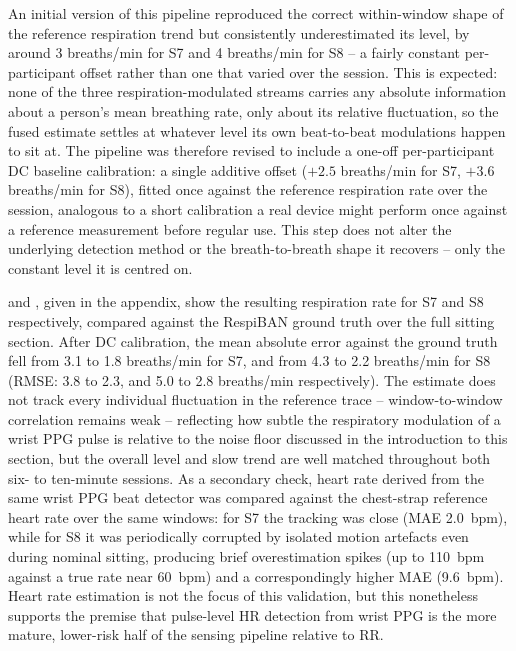 An initial version of this pipeline reproduced the correct within-window shape of the reference respiration trend but consistently underestimated its level, by around 3 breaths/min for S7 and 4 breaths/min for S8 -- a fairly constant per-participant offset rather than one that varied over the session. This is expected: none of the three respiration-modulated streams carries any absolute information about a person's mean breathing rate, only about its relative fluctuation, so the fused estimate settles at whatever level its own beat-to-beat modulations happen to sit at. The pipeline was therefore revised to include a one-off per-participant DC baseline calibration: a single additive offset ($+2.5$ breaths/min for S7, $+3.6$ breaths/min for S8), fitted once against the reference respiration rate over the session, analogous to a short calibration a real device might perform once against a reference measurement before regular use. This step does not alter the underlying detection method or the breath-to-breath shape it recovers -- only the constant level it is centred on.

 and , given in the appendix, show the resulting respiration rate for S7 and S8 respectively, compared against the RespiBAN ground truth over the full sitting section. After DC calibration, the mean absolute error against the ground truth fell from 3.1 to 1.8 breaths/min for S7, and from 4.3 to 2.2 breaths/min for S8 (RMSE: 3.8 to 2.3, and 5.0 to 2.8 breaths/min respectively). The estimate does not track every individual fluctuation in the reference trace -- window-to-window correlation remains weak -- reflecting how subtle the respiratory modulation of a wrist PPG pulse is relative to the noise floor discussed in the introduction to this section, but the overall level and slow trend are well matched throughout both six- to ten-minute sessions. As a secondary check, heart rate derived from the same wrist PPG beat detector was compared against the chest-strap reference heart rate over the same windows: for S7 the tracking was close (MAE 2.0~bpm), while for S8 it was periodically corrupted by isolated motion artefacts even during nominal sitting, producing brief overestimation spikes (up to 110~bpm against a true rate near 60~bpm) and a correspondingly higher MAE (9.6~bpm). Heart rate estimation is not the focus of this validation, but this nonetheless supports the premise that pulse-level HR detection from wrist PPG is the more mature, lower-risk half of the sensing pipeline relative to RR.

